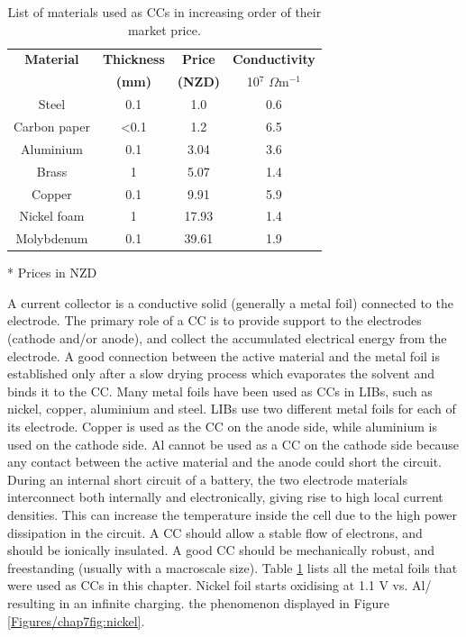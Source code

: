 \begin{table}
\centering
\begin{threeparttable}
\caption{List of materials used as CCs in increasing order of their market price.} \label{t2}
 \begin{tabular}{|c|c|c|c|} 
\hline
\textbf{Material} & \textbf{Thickness} & \textbf{Price} & \textbf{Conductivity} \\
 & \textbf{(mm)} & \textbf{(NZD)} & {10$^{7}$} {$\Omega$}m$^{-1}$ \\
\hline
Steel & 0.1 & 1.0 & 0.6 \\ 
Carbon paper & <0.1 & 1.2 & 6.5 \\
Aluminium & 0.1 & 3.04 & 3.6 \\
Brass & 1 & 5.07 & 1.4 \\
Copper & 0.1 & 9.91 & 5.9 \\ 
Nickel foam & 1 & 17.93 & 1.4 \\
Molybdenum & 0.1 & 39.61 & 1.9 \\
\hline
\end{tabular}
\begin{tablenotes}
\item [*] Prices in NZD
\end{tablenotes}
\end{threeparttable}
\end{table}
A current collector is a conductive solid (generally a metal foil) connected to the electrode. The primary role of a CC is to provide support to the electrodes (cathode and/or anode), and collect the accumulated electrical energy from the electrode. A good connection between the active material and the metal foil is established only after a slow drying process which evaporates the solvent and binds it to the CC. Many metal foils have been used as CCs in LIBs, such as nickel, copper, aluminium and steel. LIBs use two different metal foils for each of its electrode. Copper is used as the CC on the anode side, while aluminium is used on the cathode side. Al cannot be used as a CC on the cathode side because any contact between the active material and the anode could short the circuit. During an internal short circuit of a battery, the two electrode materials interconnect both internally and electronically, giving rise to high local current densities. This can increase the temperature inside the cell due to the high power dissipation in the circuit. A CC should allow a stable flow of electrons, and should be ionically insulated. A good CC should be mechanically robust, and freestanding (usually with a macroscale size). Table \ref{t2} lists all the metal foils that were used as CCs in this chapter. Nickel foil starts oxidising at 1.1 V vs. Al/ resulting in an infinite charging. the phenomenon displayed in Figure \ref{Figures/chap7fig:nickel}. 

